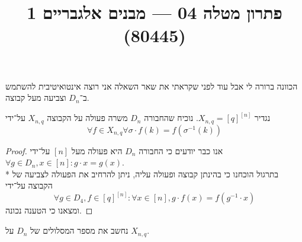 
\title{פתרון מטלה 04 --- מבנים אלגבריים 1 (80445)}


\maketitle
\maketitleprint{}

\Question{}
\Subquestion{}
הכוונה ברורה לי אבל עוד לפני שקראתי את שאר השאלה אני רוצה אינטואיטיבית להשתמש ב־$D_n$ וצביעה מעל קבוצה.

\Subquestion{}
נגדיר $X_{n, q} = {[q]}^{[n]}$.
נוכיח שהחבורה $D_n$ משרה פעולה על הקבוצה $X_{n, q}$ על־ידי
\[
	\forall f \in X_{n, q} \forall \sigma \cdot f(k) = f(\sigma^{-1}(k))
\]
\begin{proof}
	אנו כבר יודעים כי החבורה $D_n$ היא פעולה מעל $[n]$ על־ידי $\forall g \in D_n, x \in [n] : g \cdot x = g(x)$. \\*
	בתרגול הוכחנו כי בהינתן קבוצה ופעולה עליה, ניתן להרחיב את הפעולה לצביעה של הקבוצה על־ידי
	\[
		\forall g \in D_4, f \in {[q]}^{[n]} : \forall x \in [n], g \cdot f(x) = f(g^{-1} \cdot x)
	\]
	ומצאנו כי הטענה נכונה.
\end{proof}

\Subquestion{}
נחשב את מספר המסלולים של $D_n$ על $X_{n, q}$.


